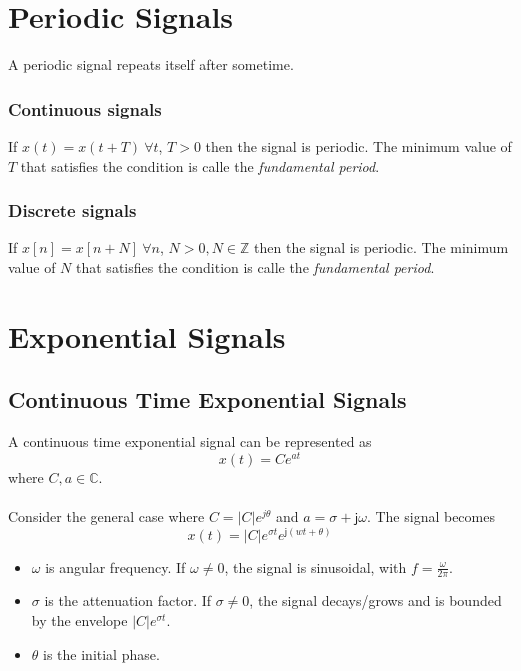 \documentclass[oneside]{book}
\begin{document}
\section{Periodic Signals}
A periodic signal repeats itself after sometime.
\subsubsection{Continuous signals}
If
\(
x(t) = x(t + T)\ \forall t
\), \(T>0\)
then the signal is periodic. The minimum value of $T$ that satisfies the condition is calle the \textit{fundamental period}.
\subsubsection{Discrete signals}
If
\(
x[n] = x[n + N]\ \forall n
\), \(N>0, N\in\mathbb{Z}\)
then the signal is periodic. The minimum value of $N$ that satisfies the condition is calle the \textit{fundamental period}.

\section{Exponential Signals}
\subsection{Continuous Time Exponential Signals}
A continuous time exponential signal can be represented as
\begin{equation}
	x(t) = Ce^{at}
\end{equation}
where \(C, a \in \mathbb{C}\).
\\\\
\noindent \cite{continuous_time_exponential_general_case}Consider the general case where \(C = |C|e^{j\theta}\) and \(a = \sigma + \mathsf{j}\omega\). The signal becomes
\[
	x(t) = |C|e^{\sigma t}e^{\mathsf{j}(wt + \theta)}
\]
\begin{itemize}
	\item $\omega$ is angular frequency. If \(\omega \neq 0\), the signal is sinusoidal, with \(f = \frac{\omega}{2\pi}\).
	\item $\sigma$ is the attenuation factor. If \(\sigma \neq 0\), the signal decays/grows and is bounded by the envelope \(|C|e^{\sigma t}\).
	\item $\theta$ is the initial phase.
\end{itemize}
\end{document}
